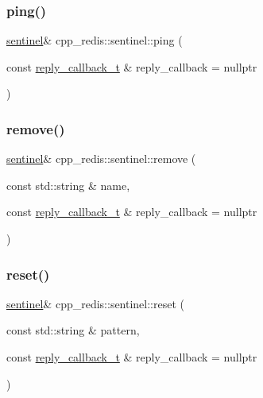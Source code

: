 \subsubsection{\texorpdfstring{ping()}{ping()}}
{\footnotesize\ttfamily \hyperlink{classcpp__redis_1_1sentinel}{sentinel}\& cpp\+\_\+redis\+::sentinel\+::ping (\begin{DoxyParamCaption}\item[{const \hyperlink{classcpp__redis_1_1sentinel_ae1a150ff8787208c47414397a061c9a7}{reply\+\_\+callback\+\_\+t} \&}]{reply\+\_\+callback = {\ttfamily nullptr} }\end{DoxyParamCaption})}

\mbox{\label{classcpp__redis_1_1sentinel_aee344f7f63bc02d13cb9dce08d48d5d9}} 
\subsubsection{\texorpdfstring{remove()}{remove()}}
{\footnotesize\ttfamily \hyperlink{classcpp__redis_1_1sentinel}{sentinel}\& cpp\+\_\+redis\+::sentinel\+::remove (\begin{DoxyParamCaption}\item[{const std\+::string \&}]{name,  }\item[{const \hyperlink{classcpp__redis_1_1sentinel_ae1a150ff8787208c47414397a061c9a7}{reply\+\_\+callback\+\_\+t} \&}]{reply\+\_\+callback = {\ttfamily nullptr} }\end{DoxyParamCaption})}

\mbox{\label{classcpp__redis_1_1sentinel_a11d5f170474aa881df3b6f3cbbde3569}} 
\subsubsection{\texorpdfstring{reset()}{reset()}}
{\footnotesize\ttfamily \hyperlink{classcpp__redis_1_1sentinel}{sentinel}\& cpp\+\_\+redis\+::sentinel\+::reset (\begin{DoxyParamCaption}\item[{const std\+::string \&}]{pattern,  }\item[{const \hyperlink{classcpp__redis_1_1sentinel_ae1a150ff8787208c47414397a061c9a7}{reply\+\_\+callback\+\_\+t} \&}]{reply\+\_\+callback = {\ttfamily nullptr} }\end{DoxyParamCaption})}

